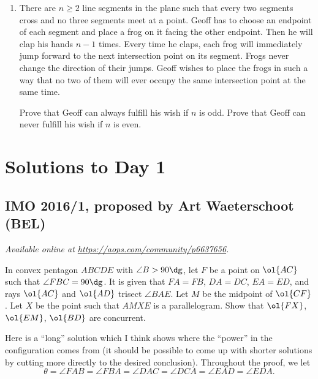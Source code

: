 \documentclass[11pt]{scrartcl}
\begin{document}
\begin{enumerate}[\bfseries 1.]
\item %
There are $n\ge 2$ line segments in the plane such that
every two segments cross and no three segments meet at a point.
Geoff has to choose an endpoint of each segment and place a frog
on it facing the other endpoint. Then he will clap his hands $n-1$ times.
Every time he claps, each frog will immediately jump forward
to the next intersection point on its segment.
Frogs never change the direction of their jumps.
Geoff wishes to place the frogs in such a way that no two of them
will ever occupy the same intersection point at the same time.

\begin{enumerate}[(a)]
  \ii Prove that Geoff can always fulfill his wish if $n$ is odd.
  \ii Prove that Geoff can never fulfill his wish if $n$ is even.
\end{enumerate}

\end{enumerate}
\pagebreak

\section{Solutions to Day 1}
\subsection{IMO 2016/1, proposed by Art Waeterschoot (BEL)}
\textsl{Available online at \url{https://aops.com/community/p6637656}.}
\begin{mdframed}[style=mdpurplebox,frametitle={Problem statement}]
In convex pentagon $ABCDE$ with $\angle B > 90\dg$,
let $F$ be a point on $\ol{AC}$ such that $\angle FBC = 90\dg$.
It is given that $FA=FB$, $DA=DC$, $EA=ED$,
and rays $\ol{AC}$ and $\ol{AD}$ trisect $\angle BAE$.
Let $M$ be the midpoint of $\ol{CF}$.
Let $X$ be the point such that $AMXE$ is a parallelogram.
Show that $\ol{FX}$, $\ol{EM}$, $\ol{BD}$ are concurrent.
\end{mdframed}
Here is a ``long'' solution which I think
shows where the ``power'' in the configuration comes from
(it should be possible to come up with shorter solutions
by cutting more directly to the desired conclusion).
Throughout the proof, we let
\[ \theta = \angle FAB = \angle FBA = \angle DAC = \angle DCA
  = \angle EAD = \angle EDA. \]
\end{document}
